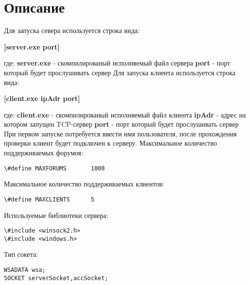 \documentclass[a4paper,12pt]{extarticle}
\begin{document}
\section{Описание}
Для запуска севера используется строка вида:
\begin{center}\large\textbf{[server.exe port]}\end{center}
где:
\newline
\textbf{server.exe} - скомпилированый исполняемый файл сервера
\newline
\textbf{port} - порт который будет прослушивать сервер
\newline
Для запуска клиента используется строка вида:
\begin{center}\large\textbf{[client.exe ipAdr port]}\end{center}
где:
\newline
\textbf{client.exe} - скомпилированый исполняемый файл клиента
\newline
\textbf{ipAdr} - адрес на котором запущен TCP-сервер
\newline
\textbf{port} - порт который будет прослушивать сервер
\newline
При первом запуске потребуется ввести имя пользователя, после прохождения проверки клиент будет подключен к серверу.
Максимальное количество поддерживаемых форумов:
\begin{verbatim}
\#define MAXFORUMS       1000
\end{verbatim}
Максимальное количество поддерживаемых клиентов:
\begin{verbatim}
\#define MAXCLIENTS      5
\end{verbatim}
Используемые библиотеки сервера:
\begin{verbatim}
\#include <winsock2.h>
\#include <windows.h>
\end{verbatim}
Тип сокета:
\begin{verbatim}
WSADATA wsa;
SOCKET serverSocket,accSocket;
\end{verbatim}
\end{document}
